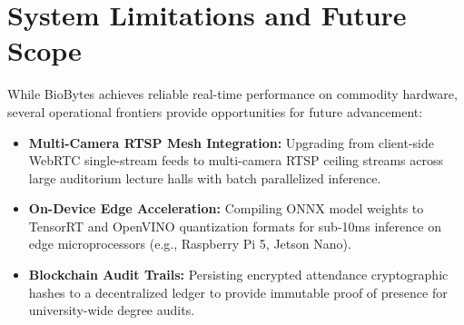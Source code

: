\section{System Limitations and Future Scope}
While BioBytes achieves reliable real-time performance on commodity hardware, several operational frontiers provide opportunities for future advancement:
\begin{itemize}
    \item \textbf{Multi-Camera RTSP Mesh Integration:} Upgrading from client-side WebRTC single-stream feeds to multi-camera RTSP ceiling streams across large auditorium lecture halls with batch parallelized inference.
    \item \textbf{On-Device Edge Acceleration:} Compiling ONNX model weights to TensorRT and OpenVINO quantization formats for sub-10ms inference on edge microprocessors (e.g., Raspberry Pi 5, Jetson Nano).
    \item \textbf{Blockchain Audit Trails:} Persisting encrypted attendance cryptographic hashes to a decentralized ledger to provide immutable proof of presence for university-wide degree audits.
\end{itemize}
